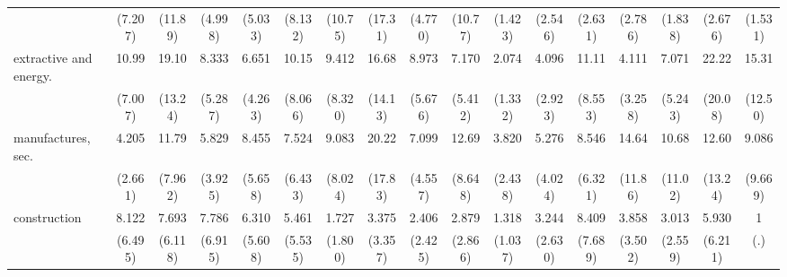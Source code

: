 {\begin{tabular}{l*{16}{c}}
                    &     (7.207)         &     (11.89)         &     (4.998)         &     (5.033)         &     (8.132)         &     (10.75)         &     (17.31)         &     (4.770)         &     (10.77)         &     (1.423)         &     (2.546)         &     (2.631)         &     (2.786)         &     (1.838)         &     (2.676)         &     (1.531)         \\
[1em]
extractive and energy.&       10.99\sym{***}&       19.10\sym{***}&       8.333\sym{***}&       6.651\sym{**} &       10.15\sym{**} &       9.412\sym{*}  &       16.68\sym{***}&       8.973\sym{***}&       7.170\sym{**} &       2.074         &       4.096\sym{*}  &       11.11\sym{**} &       4.111         &       7.071\sym{**} &       22.22\sym{***}&       15.31\sym{***}\\
                    &     (7.007)         &     (13.24)         &     (5.287)         &     (4.263)         &     (8.066)         &     (8.320)         &     (14.13)         &     (5.676)         &     (5.412)         &     (1.332)         &     (2.923)         &     (8.553)         &     (3.258)         &     (5.243)         &     (20.08)         &     (12.50)         \\
[1em]
manufactures, sec.  &       4.205\sym{*}  &       11.79\sym{***}&       5.829\sym{**} &       8.455\sym{**} &       7.524\sym{*}  &       9.083\sym{*}  &       20.22\sym{***}&       7.099\sym{**} &       12.69\sym{***}&       3.820\sym{*}  &       5.276\sym{*}  &       8.546\sym{**} &       14.64\sym{***}&       10.68\sym{*}  &       12.60\sym{*}  &       9.086\sym{*}  \\
                    &     (2.661)         &     (7.962)         &     (3.925)         &     (5.658)         &     (6.433)         &     (8.024)         &     (17.83)         &     (4.557)         &     (8.648)         &     (2.438)         &     (4.024)         &     (6.321)         &     (11.86)         &     (11.02)         &     (13.24)         &     (9.669)         \\
[1em]
construction        &       8.122\sym{**} &       7.693\sym{*}  &       7.786\sym{*}  &       6.310\sym{*}  &       5.461         &       1.727         &       3.375         &       2.406         &       2.879         &       1.318         &       3.244         &       8.409\sym{*}  &       3.858         &       3.013         &       5.930         &           1         \\
                    &     (6.495)         &     (6.118)         &     (6.915)         &     (5.608)         &     (5.535)         &     (1.800)         &     (3.357)         &     (2.425)         &     (2.866)         &     (1.037)         &     (2.630)         &     (7.689)         &     (3.502)         &     (2.559)         &     (6.211)         &         (.)         \\

\end{tabular}}
